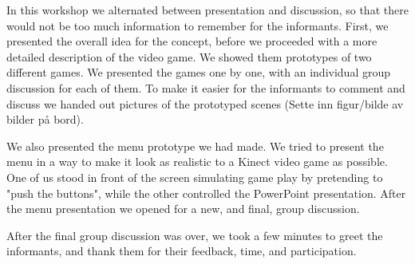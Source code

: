 In this workshop we alternated between presentation and discussion, so that there would not be too much information to remember for the informants. First, we presented the overall idea for the concept, before we proceeded with a more detailed description of the video game. We showed them prototypes of two different games. We presented the games one by one, with an individual group discussion for each of them. To make it easier for the informants to comment and discuss we handed out pictures of the prototyped scenes (Sette inn figur/bilde av bilder på bord). 

We also presented the menu prototype we had made. We tried to present the menu in a way to make it look as realistic to a Kinect video game as possible. One of us stood in front of the screen simulating game play by pretending to "push the buttons", while the other controlled the PowerPoint presentation.  After the menu presentation we opened for a new, and final, group discussion. 

After the final group discussion was over, we took a few minutes to greet the informants, and thank them for their feedback, time, and participation.
 

